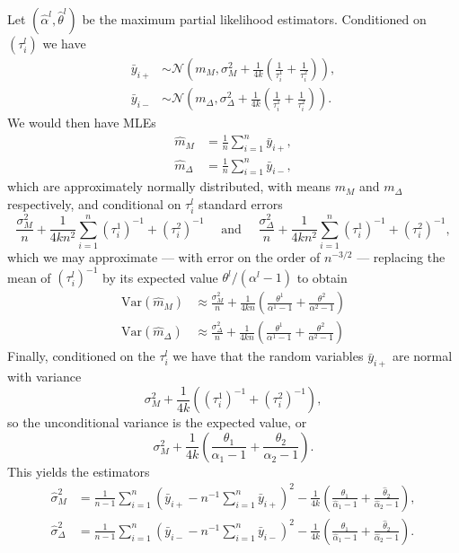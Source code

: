 \documentclass[
]{article}
\begin{document}
Let \((\hat\alpha^l,\hat\theta^l)\) be the maximum partial likelihood estimators. Conditioned on \((\tau_i^l)\) we have
\begin{align*}
  \bar{y}_{i+}&\sim \mathcal{N}\left(m_M, \sigma^2_M + \frac{1}{4k}\left( \frac{1}{\tau_i^1}+\frac{1}{\tau_i^2}\right)\right),\\
  \bar{y}_{i-}&\sim \mathcal{N}\left(m_\Delta,\sigma^2_\Delta + \frac{1}{4k}\left( \frac{1}{\tau_i^1}+\frac{1}{\tau_i^2}\right)\right).
\end{align*}
We would then have MLEs
\begin{align*}
  \hat{m}_M&= \frac{1}{n} \sum_{i=1}^n \bar{y}_{i+},\\
  \hat{m}_\Delta&= \frac{1}{n} \sum_{i=1}^n \bar{y}_{i-},
\end{align*}
which are approximately normally distributed, with means \(m_M\) and \(m_\Delta\) respectively, and conditional on \(\tau_i^l\) standard errors
\[
  \frac{\sigma_M^2}{n}+\frac{1}{4kn^2} \sum_{i=1}^n (\tau_i^1)^{-1} + (\tau_i^2)^{-1} \quad \text{ and } \quad
  \frac{\sigma_\Delta^2}{n}+\frac{1}{4kn^2} \sum_{i=1}^n (\tau_i^1)^{-1} + (\tau_i^2)^{-1},
\]
which we may approximate --- with error on the order of \(n^{-3/2}\) --- replacing the mean of \((\tau_i^l)^{-1}\) by its expected value \(\theta^l/(\alpha^l-1)\) to obtain
\begin{align*}
  \mathrm{Var}(\hat{m}_M) &\approx \frac{\sigma_M^2}{n}+\frac{1}{4kn}\left( \frac{\theta^1}{\alpha^1-1}+ \frac{\theta^2}{\alpha^2-1}\right) \\
  \mathrm{Var}(\hat{m}_\Delta) &\approx \frac{\sigma_\Delta^2}{n}+\frac{1}{4kn}\left( \frac{\theta^1}{\alpha^1-1}+ \frac{\theta^2}{\alpha^2-1}\right) 
\end{align*}
Finally, conditioned on the \(\tau_i^l\) we have that the random variables \(\bar{y}_{i+}\) are normal with variance
\[
  \sigma_M^2+\frac{1}{4k}\left((\tau_i^1)^{-1} + (\tau_i^2)^{-1} \right),
\]
so the unconditional variance is the expected value, or
\[
  \sigma_M^2+\frac{1}{4k}\left(\frac{\theta_1}{\alpha_1-1}+ \frac{\theta_2}{\alpha_2-1} \right).
\]
This yields the estimators
\begin{align*}
  \hat\sigma_M^2 &=\frac{1}{n-1}\sum_{i=1}^n\left(\bar{y}_{i+}-n^{-1}\sum_{i=1}^n \bar{y}_{i+}\right)^2 - \frac{1}{4k}\left(\frac{\hat\theta_1}{\hat\alpha_1-1}+ \frac{\hat\theta_2}{\hat\alpha_2-1} \right),\\
  \hat\sigma_\Delta^2 &=\frac{1}{n-1}\sum_{i=1}^n\left(\bar{y}_{i-}-n^{-1}\sum_{i=1}^n \bar{y}_{i-}\right)^2 - \frac{1}{4k}\left(\frac{\hat\theta_1}{\hat\alpha_1-1}+ \frac{\hat\theta_2}{\hat\alpha_2-1} \right).
\end{align*}
\end{document}
